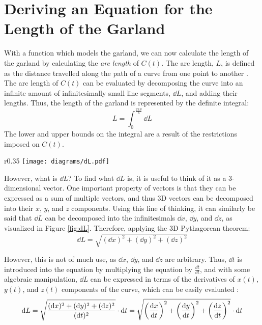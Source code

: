 \section{Deriving an Equation for the Length of the Garland}

With a function which models the garland, we can now calculate the length of the garland by calculating the \emph{arc length} of $C(t)$. The arc length, $L$, is defined as the distance travelled along the path of a curve from one point to another \autocite{ArcLength2017}. The arc length of $C(t)$ can be evaluated by decomposing the curve into an infinite amount of infinitesimally small line segments, $\dd{L}$, and adding their lengths. Thus, the length of the garland is represented by the definite integral:
\begin{equation}
    L=\int_0^\frac{2\pi S}{\lambda} \dd{L} \label{eq:arclen}
\end{equation}
The lower and upper bounds on the integral are a result of the restrictions imposed on $C(t)$.

\begin{wrapfigure}{r}{0.35\textwidth}
    \centering
    \texttt{[image: diagrams/dL.pdf]}
    \caption{$\dd{L}$ in terms of $\dd{x}$, $\dd{y}$, and $\dd{z}$} \label{fig:dL}
\end{wrapfigure}
However, what is $\dd{L}$? To find what $\dd{L}$ is, it is useful to think of it as a 3-dimensional vector. One important property of vectors is that they can be expressed as a sum of multiple vectors, and thus 3D vectors can be decomposed into their $x$, $y$, and $z$  components. Using this line of thinking, it can similarly be said that $\dd{L}$ can be
decomposed into the infinitesimals $\dd{x}$, $\dd{y}$, and $\dd{z}$, as visualized in Figure \ref{fig:dL}. Therefore, applying the 3D Pythagorean theorem:
\begin{equation*}
    \dd{L} = \sqrt{(\dd{x})^2+(\dd{y})^2+(\dd{z})^2}
\end{equation*}

However, this is not of much use, as $\dd{x}$, $\dd{y}$, and $\dd{z}$ are arbitrary. Thus, $\dd{t}$ is introduced into the equation by multiplying the equation by $\frac{\dd{t}}{\dd{t}}$, and with some algebraic manipulation, $\dd{L}$ can be expressed in terms of the derivatives of $x(t)$, $y(t)$, and $z(t)$ components of the curve, which can be easily evaluated \autocite{schlickerArcLength}:
\begin{equation*}
    \dd{L} = \sqrt{\frac{(\dd{x})^2+(\dd{y})^2+(\dd{z})^2}{(\dd{t})^2}} \cdot \dd{t} = \sqrt{\left(\dv{x}{t}\right)^2+\left(\dv{y}{t}\right)^2+\left(\dv{z}{t}\right)^2} \cdot \dd{t}
\end{equation*}

